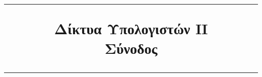 

\ifdefined\isfirstsession

\else

\fi

\title{%
  \vspace{0.3cm}%
  \hrule height 2pt%
  \vspace{0.3cm} Δίκτυα Υπολογιστών ΙΙ\\
  \Sessionnumber{} Σύνοδος%
  \vspace{0.3cm}%
  \hrule height 2pt%
  \vspace{0.3cm}
}


\deactivateBG
\maketitle
\tableofcontents
\listoffigures
\clearpage %
\activateBG
{}
\setcounter{page}{1}






